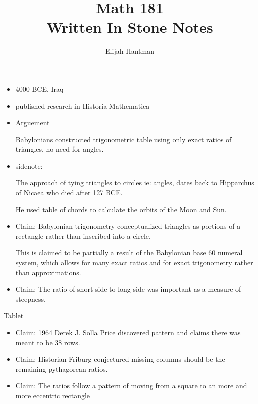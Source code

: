 \documentclass{report}
\title{\Huge{Math 181}\\Written In Stone Notes}
\author{\huge{Elijah Hantman}}
\date{}
\begin{document}
\maketitle
\newpage

\begin{itemize}
    \item 4000 BCE, Iraq
    \item published research in Historia Mathematica
    \item Arguement
        \begin{mdframed}
            Babylonians constructed trigonometric
            table using only exact ratios of
            triangles, no need for angles.
        \end{mdframed}
    \item sidenote:
        \begin{mdframed}
            The approach of tying triangles to circles
            ie: angles, dates back to Hipparchus
            of Nicaea who died after 127 BCE.

            He used table of chords to calculate the orbits
            of the Moon and Sun.
        \end{mdframed}
    \item Claim: Babylonian trigonometry conceptualized
        triangles as portions of a rectangle rather than
        inscribed into a circle.
        \begin{mdframed}
            This is claimed to be partially a result of the
            Babylonian base 60 numeral system, which allows
            for many exact ratios and for exact trigonometry
            rather than approximations.
        \end{mdframed}
    \item Claim: The ratio of short side to long side
        was important as a measure of steepness.
\end{itemize}
{\large Tablet}
\begin{itemize}
    \item Claim: 1964 Derek J. Solla Price discovered
        pattern and claims there was meant to be
        38 rows.
    \item Claim: Historian Friburg conjectured missing
        columns should be the remaining pythagorean
        ratios.
    \item Claim: The ratios follow a pattern of moving
        from a square to an more and more eccentric
        rectangle
\end{itemize}
\end{document}
